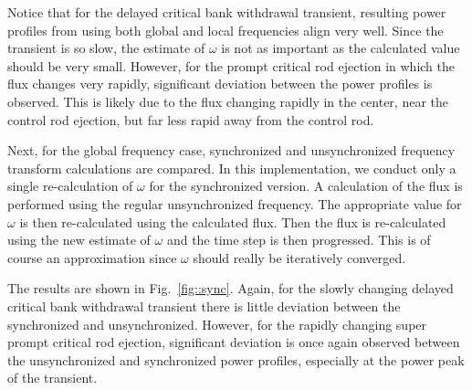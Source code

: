 \documentclass[12pt]{report}
\begin{document}
	Notice that for the delayed critical bank withdrawal transient, resulting power profiles from using both global and local frequencies align very well. Since the transient is so slow, the estimate of $\omega$ is not as important as the calculated value should be very small. However, for the prompt critical rod ejection in which the flux changes very rapidly, significant deviation between the power profiles is observed. This is likely due to the flux changing rapidly in the center, near the control rod ejection, but far less rapid away from the control rod. 

	Next, for the global frequency case, synchronized and unsynchronized frequency transform calculations are compared. In this implementation, we conduct only a single re-calculation of $\omega$ for the synchronized version. A calculation of the flux is performed using the regular unsynchronized frequency. The appropriate value for $\omega$ is then re-calculated using the calculated flux. Then the flux is re-calculated using the new estimate of $\omega$ and the time step is then progressed. This is of course an approximation since $\omega$ should really be iteratively converged. 
	
	The results are shown in Fig.~\ref{fig::sync}. Again, for the slowly changing delayed critical bank withdrawal transient there is little deviation between the synchronized and unsynchronized. However, for the rapidly changing super prompt critical rod ejection, significant deviation is once again observed between the unsynchronized and synchronized power profiles, especially at the power peak of the transient.
	
\end{document}
